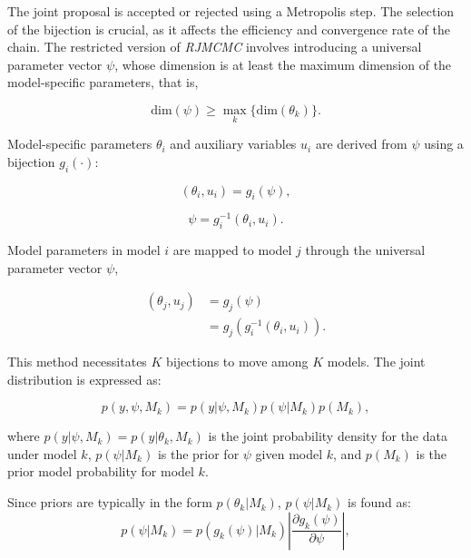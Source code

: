 \documentclass[
  11pt,
]{article}
\begin{document}
The joint proposal is accepted or rejected using a Metropolis step. The
selection of the bijection is crucial, as it affects the efficiency and
convergence rate of the chain. The restricted version of \emph{RJMCMC}
involves introducing a universal parameter vector \(\psi\), whose
dimension is at least the maximum dimension of the model-specific
parameters, that is,

\begin{equation}
\text{dim}(\psi) \geq \max_{k} \{\text{dim}(\theta_{k})\}.
\end{equation}

Model-specific parameters \(\theta_i\) and auxiliary variables \(u_i\)
are derived from \(\psi\) using a bijection \(g_i(\cdot)\):

\begin{equation}
(\theta_{i}, u_{i}) = g_{i}(\psi),
\end{equation}

\begin{equation}
\psi = g_{i}^{-1}(\theta_{i}, u_{i}).
\end{equation}

Model parameters in model \(i\) are mapped to model \(j\) through the
universal parameter vector \(\psi\),

\begin{equation} 
\begin{split}
(\theta_{j}, u_{j}) &= g_{j}(\psi) \\
                    &= g_{j}(g_{i}^{-1}(\theta_{i}, u_{i})).
\end{split}
\end{equation}

This method necessitates \(K\) bijections to move among \(K\) models.
The joint distribution is expressed as:

\begin{equation}
p(y,\psi,M_k)=p(y|\psi,M_k)p(\psi|M_k)p(M_k),
\end{equation}

where \(p(y|\psi,M_k)=p(y|\theta_k,M_k)\) is the joint probability
density for the data under model \(k\), \(p(\psi|M_k)\) is the prior for
\(\psi\) given model \(k\), and \(p(M_k)\) is the prior model
probability for model \(k\).

Since priors are typically in the form \(p(\theta_k|M_k)\),
\(p(\psi|M_k)\) is found as: \begin{equation}
p(\psi|M_k) = p(g_k(\psi)|M_k) \left| \frac{\partial g_k(\psi)}{\partial \psi} \right|,
\end{equation}
\end{document}

